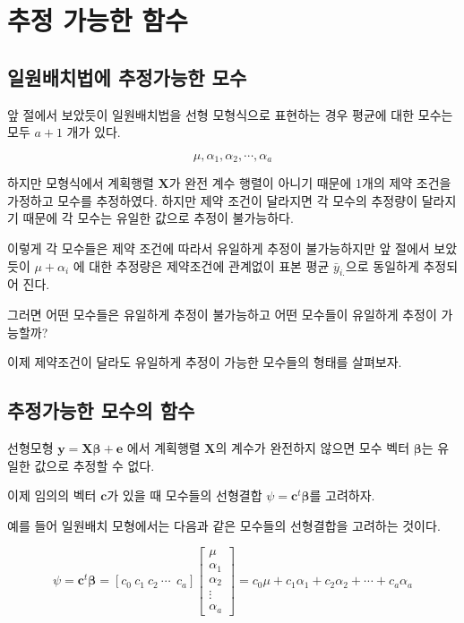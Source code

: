 \documentclass[
  10pt,
]{book}
\theoremstyle{definition}
\theoremstyle{definition}
\theoremstyle{definition}
\theoremstyle{definition}
\theoremstyle{remark}
\begin{document}
\hypertarget{uxcd94uxc815-uxac00uxb2a5uxd55c-uxd568uxc218}{%
\section{추정 가능한 함수}\label{uxcd94uxc815-uxac00uxb2a5uxd55c-uxd568uxc218}}

\hypertarget{uxc77cuxc6d0uxbc30uxce58uxbc95uxc5d0-uxcd94uxc815uxac00uxb2a5uxd55c-uxbaa8uxc218}{%
\subsection{일원배치법에 추정가능한 모수}\label{uxc77cuxc6d0uxbc30uxce58uxbc95uxc5d0-uxcd94uxc815uxac00uxb2a5uxd55c-uxbaa8uxc218}}

앞 절에서 보았듯이 일원배치법을 선형 모형식으로 표현하는 경우 평균에 대한 모수는 모두 \(a+1\) 개가 있다.

\[ \mu, \alpha_1, \alpha_2, \cdots, \alpha_a \]

하지만 모형식에서 계획행렬 \(\bm X\)가 완전 계수 행렬이 아니기 때문에 1개의 제약 조건을 가정하고 모수를 추정하였다.
하지만 제약 조건이 달라지면 각 모수의 추정량이 달라지기 때문에 각 모수는 유일한 값으로 추정이 불가능하다.

이렇게 각 모수들은 제약 조건에 따라서 유일하게 추정이 불가능하지만 앞 절에서 보았듯이 \(\mu + \alpha_i\) 에 대한 추정량은 제약조건에 관계없이
표본 평균 \(\bar y_{i.}\)으로 동일하게 추정되어 진다.

그러면 어떤 모수들은 유일하게 추정이 불가능하고 어떤 모수들이 유일하게 추정이 가능할까?

이제 제약조건이 달라도 유일하게 추정이 가능한 모수들의 형태를 살펴보자.

\hypertarget{uxcd94uxc815uxac00uxb2a5uxd55c-uxbaa8uxc218uxc758-uxd568uxc218}{%
\subsection{추정가능한 모수의 함수}\label{uxcd94uxc815uxac00uxb2a5uxd55c-uxbaa8uxc218uxc758-uxd568uxc218}}

선형모형 \(\bm y =\bm X \bm \beta + \bm e\) 에서 계획행렬 \(\bm X\)의 계수가 완전하지 않으면 모수 벡터 \(\bm \beta\)는 유일한 값으로 추정할 수 없다.

이제 임의의 벡터 \(\bm c\)가 있을 때 모수들의 선형결합 \(\psi = \bm c^t \bm \beta\)를 고려하자.

예를 들어 일원배치 모형에서는 다음과 같은 모수들의 선형결합을 고려하는 것이다.

\[ \psi = \bm c^t \bm \beta = 
[ c_0~ c_1~ c_2~ \cdots~~c_a] 
\begin{bmatrix}
\mu \\
\alpha_1 \\
\alpha_2 \\
\vdots \\
\alpha_a
\end{bmatrix}
=c_0 \mu + c_1 \alpha_1 + c_2 \alpha_2 + \cdots + c_a \alpha_a \]
\end{document}

